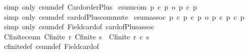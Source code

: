 \begin{isabellebody}
%
\isadelimproof
%
\endisadelimproof
%
\isatagproof
{}\isamarkupfalse%
\ {\isacharparenleft}{\kern0pt}simp\ only{\isacharcolon}{\kern0pt}\ csum{\isacharunderscore}{\kern0pt}def\ Card{\isacharunderscore}{\kern0pt}order{\isacharunderscore}{\kern0pt}Plus{}{\isacharparenright}{\kern0pt}%
\endisatagproof
{\isafoldproof}%
%
\isadelimproof
\isanewline
%
\endisadelimproof
\isanewline
{}\isamarkupfalse%
\ csum{\isacharunderscore}{\kern0pt}com{\isacharcolon}{\kern0pt}\ {\isachardoublequoteopen}p{}\ {\isacharplus}{\kern0pt}c\ p{}\ {\isacharequal}{\kern0pt}o\ p{}\ {\isacharplus}{\kern0pt}c\ p{}{\isachardoublequoteclose}\isanewline
%
\isadelimproof
%
\endisadelimproof
%
\isatagproof
{}\isamarkupfalse%
\ {\isacharparenleft}{\kern0pt}simp\ only{\isacharcolon}{\kern0pt}\ csum{\isacharunderscore}{\kern0pt}def\ card{\isacharunderscore}{\kern0pt}of{\isacharunderscore}{\kern0pt}Plus{\isacharunderscore}{\kern0pt}commute{\isacharparenright}{\kern0pt}%
\endisatagproof
{\isafoldproof}%
%
\isadelimproof
\isanewline
%
\endisadelimproof
\isanewline
{}\isamarkupfalse%
\ csum{\isacharunderscore}{\kern0pt}assoc{\isacharcolon}{\kern0pt}\ {\isachardoublequoteopen}{\isacharparenleft}{\kern0pt}p{}\ {\isacharplus}{\kern0pt}c\ p{}{\isacharparenright}{\kern0pt}\ {\isacharplus}{\kern0pt}c\ p{}\ {\isacharequal}{\kern0pt}o\ p{}\ {\isacharplus}{\kern0pt}c\ p{}\ {\isacharplus}{\kern0pt}c\ p{}{\isachardoublequoteclose}\isanewline
%
\isadelimproof
%
\endisadelimproof
%
\isatagproof
{}\isamarkupfalse%
\ {\isacharparenleft}{\kern0pt}simp\ only{\isacharcolon}{\kern0pt}\ csum{\isacharunderscore}{\kern0pt}def\ Field{\isacharunderscore}{\kern0pt}card{\isacharunderscore}{\kern0pt}of\ card{\isacharunderscore}{\kern0pt}of{\isacharunderscore}{\kern0pt}Plus{\isacharunderscore}{\kern0pt}assoc{\isacharparenright}{\kern0pt}%
\endisatagproof
{\isafoldproof}%
%
\isadelimproof
\isanewline
%
\endisadelimproof
\isanewline
{}\isamarkupfalse%
\ Cfinite{\isacharunderscore}{\kern0pt}csum{\isacharcolon}{\kern0pt}\ {\isachardoublequoteopen}{\isasymlbrakk}Cfinite\ r{\isacharsemicolon}{\kern0pt}\ Cfinite\ s{\isasymrbrakk}\ {\isasymLongrightarrow}\ Cfinite\ {\isacharparenleft}{\kern0pt}r\ {\isacharplus}{\kern0pt}c\ s{\isacharparenright}{\kern0pt}{\isachardoublequoteclose}\isanewline
%
\isadelimproof
\ \ %
\endisadelimproof
%
\isatagproof
{}\isamarkupfalse%
\ cfinite{\isacharunderscore}{\kern0pt}def\ csum{\isacharunderscore}{\kern0pt}def\ Field{\isacharunderscore}{\kern0pt}card{\isacharunderscore}{\kern0pt}of\ \isamarkupfalse%

\end{isabellebody}
